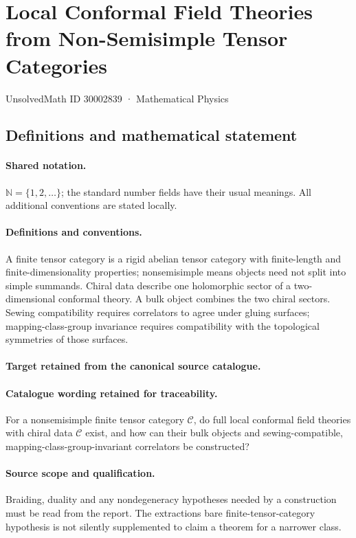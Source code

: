 \documentclass[11pt]{article}
\begin{document}
\setcounter{section}{30002838}
\section{Local Conformal Field Theories from Non-Semisimple Tensor Categories}\label{30002839}
{\small UnsolvedMath ID 30002839 · Mathematical Physics}
\subsection{Definitions and mathematical statement}

\paragraph{Shared notation.}$\mathbb N=\{1,2,\ldots\}$; the standard number fields have their usual meanings. All additional conventions are stated locally.


\paragraph{Definitions and conventions.}
A finite tensor category is a rigid abelian tensor category with finite-length and finite-dimensionality properties; nonsemisimple means objects need not split into simple summands. Chiral data describe one holomorphic sector of a two-dimensional conformal theory. A bulk object combines the two chiral sectors. Sewing compatibility requires correlators to agree under gluing surfaces; mapping-class-group invariance requires compatibility with the topological symmetries of those surfaces.

\paragraph{Target retained from the canonical source catalogue.}
\paragraph{Catalogue wording retained for traceability.}
For a nonsemisimple finite tensor category $\mathcal C$, do full local conformal field theories with chiral data $\mathcal C$ exist, and how can their bulk objects and sewing-compatible, mapping-class-group-invariant correlators be constructed?

\paragraph{Source scope and qualification.}
Braiding, duality and any nondegeneracy hypotheses needed by a construction must be read from the report. The extraction\textquotesingle s bare finite-tensor-category hypothesis is not silently supplemented to claim a theorem for a narrower class.
\end{document}
